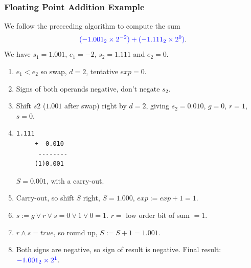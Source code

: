 \documentclass{beamer}
\begin{document}
\begin{frame}[fragile]
\frametitle{Floating Point Addition Example}

\scriptsize

We follow the preeceding algorithm to compute the sum
$$
\textcolor{blue}{(-1.001_2\times 2^{-2}) + (-1.111_2\times 2^{0})}.
$$
We have $s_1 = 1.001$, $e_1 = -2$, $s_2 = 1.111$ and $e_2 = 0$.\\

\begin{enumerate}

\item $e_1 < e_2$ so swap, $d = 2$, tentative $exp = 0$.\\

\item Signs of both operands negative, don't negate $s_2$.\\

\item Shift $s2$ ($1.001$ after swap) right by $d = 2$, giving $s_2 = 0.010$, $g = 0$, $r = 1$, $s = 0$.\\

\item
  \begin{center}
    \begin{Verbatim}[commandchars=@\[\]]
        1.111
     +  0.010
      --------
     (1)0.001
    \end{Verbatim}
  \end{center} $S = 0.001$, with a carry-out.\\

\item Carry-out, so shift $S$ right, $S = 1.000$, $exp := exp + 1 = 1$.\\

\item $s := g \vee r \vee s = 0 \vee 1 \vee 0 = 1$. $r =$ low order bit of sum $= 1$.\\

\item $r \wedge s = true$, so round up, $S := S + 1 = 1.001$.\\

\item Both signs are negative, so sign of result is negative. Final result: $\textcolor{blue}{-1.001_2\times 2^1}$.

\end{enumerate}

\end{frame}
\end{document}

